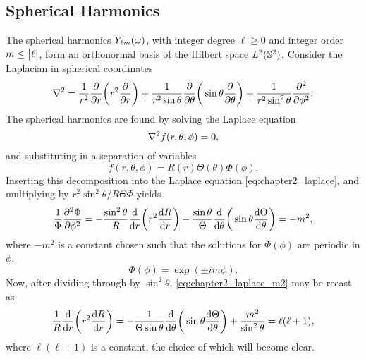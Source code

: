 \subsection{Spherical Harmonics}\label{sec:chapter2_spherical_harmonics}

The spherical harmonics \({Y}_{\ell m}(\omega)\), with integer degree \(\ell \geq 0\) and integer order \(m \leq \big\lvert\ell\big\rvert\), form an orthonormal basis of the Hilbert space \(L^{2}(\mathbb{S}^{2})\).
Consider the Laplacian in spherical coordinates
%
\begin{equation}
    \laplacian
    = \frac{1}{r^{2}} \pdv{r} \bigg(r^{2} \pdv{r}\bigg)
    + \frac{1}{r^{2}\sin{\theta}} \pdv{\theta} \bigg(\sin{\theta} \pdv{\theta}\bigg)
    + \frac{1}{r^{2}\sin^{2}{\theta}} \pdv[2]{\phi}.
\end{equation}
%
The spherical harmonics are found by solving the Laplace equation
%
\begin{equation}\label{eq:chapter2_laplace}
    \laplacian{f(r,\theta,\phi)}
    = 0,
\end{equation}
%
and substituting in a separation of variables
%
\begin{equation}
    f(r,\theta,\phi)
    = R(r)\Theta(\theta)\Phi(\phi).
\end{equation}
%
Inserting this decomposition into the Laplace equation \cref{eq:chapter2_laplace}, and multiplying by \(r^{2}\sin^{2}{\theta}/R\Theta\Phi{}\) yields
%
\begin{equation}\label{eq:chapter2_laplace_m2}
    \frac{1}{\Phi} \pdv[2]{\Phi}{\phi}
    = -\frac{\sin^{2}{\theta}}{R} \dv{r} \bigg(r^{2} \dv{R}{r}\bigg)
    - \frac{\sin{\theta}}{\Theta} \dv{\theta} \bigg(\sin{\theta} \dv{\Theta}{\theta}\bigg)
    = -m^{2},
\end{equation}
%
where \(-m^{2}\) is a constant chosen such that the solutions for \(\Phi(\phi)\) are periodic in \(\phi{}\), \ie{}
%
\begin{equation}
    \Phi(\phi)
    = \exp(\pm i m\phi).
\end{equation}
%
Now, after dividing through by \(\sin^{2}{\theta}\), \cref{eq:chapter2_laplace_m2} may be recast as
%
\begin{equation}
    \frac{1}{R} \dv{r} \bigg(r^{2} \dv{R}{r}\bigg)
    = -\frac{1}{\Theta\sin{\theta}} \dv{\theta} \bigg(\sin{\theta} \dv{\Theta}{\theta}\bigg)
    + \frac{m^{2}}{\sin^{2}{\theta}}
    = \ell(\ell+1),
\end{equation}
%
where \(\ell(\ell+1)\) is a constant, the choice of which will become clear.
